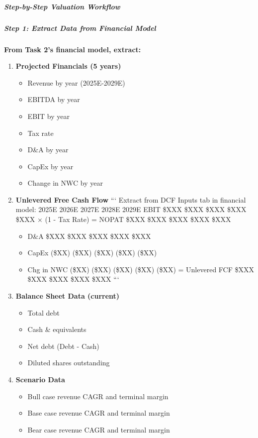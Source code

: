 \documentclass[11pt]{article}
\begin{document}
\subparagraph{Step-by-Step Valuation Workflow}\mbox{}\par

\subparagraph{Step 1: Extract Data from Financial Model}\mbox{}\par

\textbf{From Task 2's financial model, extract:}


\begin{enumerate}[leftmargin=*,itemsep=2pt,topsep=2pt]
\item {} \textbf{Projected Financials (5 years)}
\begin{itemize}[leftmargin=*,itemsep=2pt,topsep=2pt]
\item {} Revenue by year (2025E-2029E)
\item {} EBITDA by year
\item {} EBIT by year
\item {} Tax rate
\item {} D\&A by year
\item {} CapEx by year
\item {} Change in NWC by year
\end{itemize}
\item {} \textbf{Unlevered Free Cash Flow} ``` Extract from DCF Inputs tab in financial model: 2025E   2026E   2027E   2028E   2029E EBIT            \$XXX    \$XXX    \$XXX    \$XXX    \$XXX × (1 - Tax Rate) = NOPAT         \$XXX    \$XXX    \$XXX    \$XXX    \$XXX
\begin{itemize}[leftmargin=*,itemsep=2pt,topsep=2pt]
\item {} D\&A           \$XXX    \$XXX    \$XXX    \$XXX    \$XXX
\item {} CapEx         (\$XX)   (\$XX)   (\$XX)   (\$XX)   (\$XX)
\item {} Chg in NWC    (\$XX)   (\$XX)   (\$XX)   (\$XX)   (\$XX) = Unlevered FCF \$XXX    \$XXX    \$XXX    \$XXX    \$XXX ```
\end{itemize}
\item {} \textbf{Balance Sheet Data (current)}
\begin{itemize}[leftmargin=*,itemsep=2pt,topsep=2pt]
\item {} Total debt
\item {} Cash \& equivalents
\item {} Net debt (Debt - Cash)
\item {} Diluted shares outstanding
\end{itemize}
\item {} \textbf{Scenario Data}
\begin{itemize}[leftmargin=*,itemsep=2pt,topsep=2pt]
\item {} Bull case revenue CAGR and terminal margin
\item {} Base case revenue CAGR and terminal margin
\item {} Bear case revenue CAGR and terminal margin
\end{itemize}
\end{enumerate}
\end{document}
